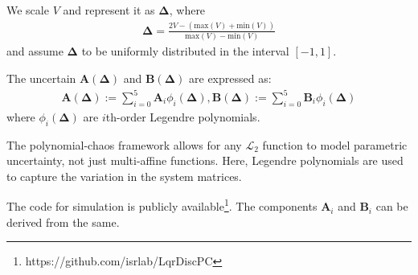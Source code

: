 \documentclass[letterpaper, 10 pt, conference]{ieeeconf}  %
\newcommand{\vo}[1]{\boldsymbol{#1}}
\newcommand{\comment}[1]{\textcolor{red}{#1}}
\newcommand{\Del}{\vo{\Delta}}
\begin{document}
We scale $V$ and represent it as $\Del$, where
\begin{align*}
  \Del = \frac{2V - (\textrm{max}(V) + \textrm{min}(V))}{\textrm{max}(V) - \textrm{min}(V)}
\end{align*}
and assume $\Del$ to be uniformly distributed in the interval $[-1,1]$.

The uncertain $\vo{A}(\Del)$ and $\vo{B}(\Del)$ are expressed as:
\begin{align*}
  \vo{A}(\Del) := \sum_{i=0}^{5} \vo{A}_i \phi_i (\Del), \vo{B}(\Del) := \sum_{i=0}^{5} \vo{B}_i \phi_i (\Del)
\end{align*}
where $\phi_i(\Del)$ are $i$th-order Legendre polynomials.


The polynomial-chaos framework allows for any $\mathcal{L}_2$ function to model parametric uncertainty, not just multi-affine functions. Here, Legendre polynomials are used to capture the variation in the system matrices.


The code for simulation is publicly available\footnote{https://github.com/isrlab/LqrDiscPC}.
The components $\vo{A}_i$  and $\vo{B}_i$ can be derived from the same.
\end{document}
